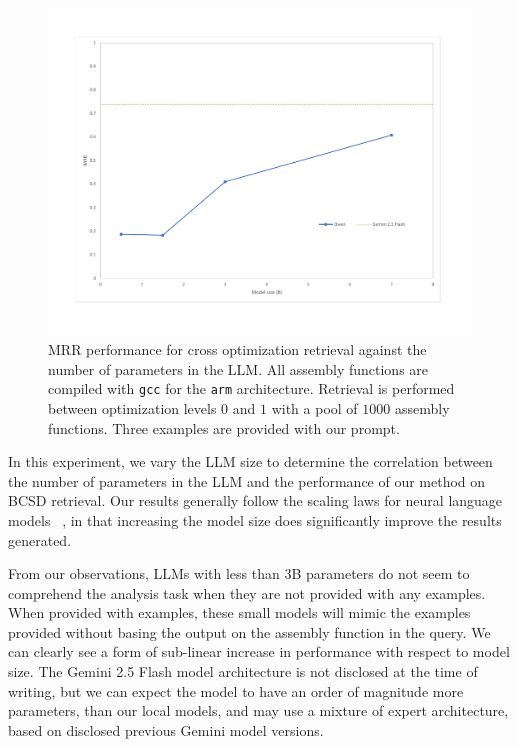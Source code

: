\begin{figure}[htbp]
\centerline{\includegraphics[width=\linewidth]{size-ablation}}
\caption{MRR performance for cross optimization retrieval against the number of parameters in the LLM. All assembly functions are compiled
with \texttt{gcc} for the \texttt{arm} architecture. Retrieval is performed between optimization levels \(0\) and \(1\) with a pool of \(1000\) assembly functions.
Three examples are provided with our prompt.}
\label{size-abl}
\end{figure}

In this experiment, we vary the LLM size to determine the correlation between the number of parameters in the LLM and the performance
of our method on BCSD retrieval. Our results generally follow the scaling laws for neural language models ~\cite{scaling-laws}, in that increasing
the model size does significantly improve the results generated.

From our observations, LLMs with less than \(3\)B parameters do not seem to comprehend the analysis task when
they are not provided with any examples. When provided with examples, these small models will mimic the examples provided without basing the
output on the assembly function in the query. We can clearly see a form of sub-linear increase in performance with respect to model size.
The Gemini 2.5 Flash model architecture is not disclosed at the time of writing, but we can expect the model to have an order
of magnitude more parameters, than our local models, and may use a mixture of expert architecture, based on disclosed previous Gemini model versions.

